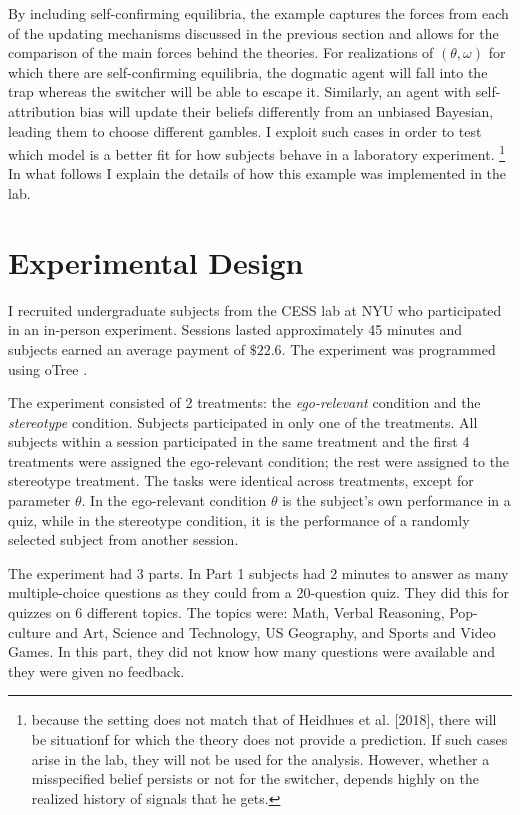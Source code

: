 \documentclass[
  12pt,
]{article}
\begin{document}
By including self-confirming equilibria, the example captures the forces
from each of the updating mechanisms discussed in the previous section
and allows for the comparison of the main forces behind the theories.
For realizations of \((\theta, \omega)\) for which there are
self-confirming equilibria, the dogmatic agent will fall into the trap
whereas the switcher will be able to escape it. Similarly, an agent with
self-attribution bias will update their beliefs differently from an
unbiased Bayesian, leading them to choose different gambles. I exploit
such cases in order to test which model is a better fit for how subjects
behave in a laboratory experiment.
\footnote{because the setting does not match that of Heidhues et al. [2018], there will be situationf for which the theory 
does not provide a prediction. If such cases arise in the lab, they will not be used for the analysis. However, whether a misspecified 
belief persists or not for the switcher, depends highly on the realized history of signals that he gets.}
In what follows I explain the details of how this example was
implemented in the lab.

\hypertarget{experimental-design}{%
\section{Experimental Design}\label{experimental-design}}

I recruited undergraduate subjects from the CESS lab at NYU who
participated in an in-person experiment. Sessions lasted approximately
45 minutes and subjects earned an average payment of \(\$22.6\). The
experiment was programmed using oTree \citep{otree}.

The experiment consisted of 2 treatments: the \emph{ego-relevant}
condition and the \emph{stereotype} condition. Subjects participated in
only one of the treatments. All subjects within a session participated
in the same treatment and the first 4 treatments were assigned the
ego-relevant condition; the rest were assigned to the stereotype
treatment. The tasks were identical across treatments, except for
parameter \(\theta\). In the ego-relevant condition \(\theta\) is the
subject's own performance in a quiz, while in the stereotype condition,
it is the performance of a randomly selected subject from another
session.

The experiment had 3 parts. In Part 1 subjects had 2 minutes to answer
as many multiple-choice questions as they could from a 20-question quiz.
They did this for quizzes on 6 different topics. The topics were: Math,
Verbal Reasoning, Pop-culture and Art, Science and Technology, US
Geography, and Sports and Video Games. In this part, they did not know
how many questions were available and they were given no feedback.
\end{document}
